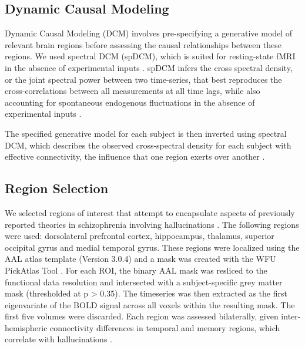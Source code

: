 \documentclass{article}
\begin{document}
\subsection{Dynamic Causal Modeling}

Dynamic Causal Modeling (DCM) involves pre-specifying a generative model of relevant brain regions before assessing the causal relationships between these regions. We used spectral DCM (spDCM), which is suited for resting-state fMRI in the absence of experimental inputs \citep{friston_dcm_2014, razi_construct_2015}. spDCM infers the cross spectral density, or the joint spectral power between two time-series, that best reproduces the cross-correlations between all measurements at all time lags, while also accounting for spontaneous endogenous fluctuations in the absence of experimental inputs \citep{novelli_spectral_2024}. 

The specified generative model for each subject is then inverted using spectral DCM, which describes the observed cross-spectral density for each subject with effective connectivity, the influence that one region exerts over another \citep{friston_dcm_2014, novelli_spectral_2024}. 

\subsection{Region Selection}

We selected regions of interest that attempt to encapsulate aspects of previously reported theories in schizophrenia involving hallucinations \citep{leptourgos_hallucinations_2020}. The following regions were used: dorsolateral prefrontal cortex, hippocampus, thalamus, superior occipital gyrus and medial temporal gyrus. These regions were localized using the AAL atlas template (Version 3.0.4) and a mask was created with the WFU PickAtlas Tool \citep{tzourio-mazoyer_automated_2002}. For each ROI, the binary AAL mask was resliced to the functional data resolution and intersected with a subject-specific grey matter mask (thresholded at p > 0.35). The timeseries was then extracted as the first eigenvariate of the BOLD signal across all voxels within the resulting mask. The first five volumes were discarded. Each region was assessed bilaterally, given inter-hemispheric connectivity differences in temporal and memory regions, which correlate with hallucinations \citep{chen_reduced_2022}. %
\end{document}
